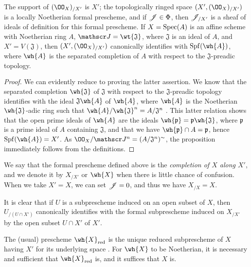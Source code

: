 \begin{prop}[10.8.5]
\label{1.10.8.5}
The support of $(\OO_X)_{/X'}$ is $X'$; the topologically ringed space $(X',(\OO_X)_{/X'})$ is a locally Noetherian formal prescheme, and if $\mathscr{J}\in\Phi$, then $\mathscr{J}_{/X'}$ is a sheaf of ideals of definition for this formal prescheme.
If $X=\operatorname{Spec}(A)$ is an affine scheme with Noetherian ring $A$, $\sh{J}=\wt{\mathfrak{J}}$, where $\mathfrak{J}$ is an ideal of $A$, and $X'=V(\mathfrak{J})$, then $(X',(\OO_X)_{/X'})$ canonically identifies with $\Spf(\wh{A})$, where $\wh{A}$ is the separated completion of $A$ with respect to the $\mathfrak{J}$-preadic topology.
\end{prop}

\begin{proof}
\label{proof-1.10.8.5}
We can evidently reduce to proving the latter assertion.
We know  that the separated completion $\wh{\mathfrak{J}}$ of $\mathfrak{J}$ with respect to the $\mathfrak{J}$-preadic topology identifies with the ideal $\mathfrak{J}\wh{A}$ of $\wh{A}$, where $\wh{A}$ is the Noetherian $\wh{\mathfrak{J}}$-adic ring such that $\wh{A}/\wh{\mathfrak{J}}^n=A/\mathfrak{J}^n$ .
This latter relation shows that the open prime ideals of $\wh{A}$ are the ideals $\wh{\mathfrak{p}}=\mathfrak{p}\wh{\mathfrak{J}}$, where $\mathfrak{p}$ is a prime ideal of $A$ containing $\mathfrak{J}$, and that we have $\wh{\mathfrak{p}}\cap A=\mathfrak{p}$, hence $\Spf(\wh{A})=X'$.
As $\OO_X/\sh{J}^n=(A/\mathfrak{J}^n)^\sim$, the proposition immediately follows from the definitions.
\end{proof}

We say that the formal prescheme defined above is the \emph{completion of $X$ along $X'$}, and we denote it by $X_{/X'}$ or $\wh{X}$ when there is little chance of confusion.
When we take $X'=X$, we can set $\mathscr{J}=0$, and thus we have $X_{/X}=X$.

It is clear that if $U$ is a subprescheme induced on an open subset of $X$, then $U_{/(U\cap X')}$ canonically identifies with the formal subprescheme induced on $X_{/X'}$ by the open subset $U\cap X'$ of $X'$.

\begin{cor}[10.8.6]
\label{1.10.8.6}
The (usual) prescheme $\wh{X}_\red$ is the unique reduced subprescheme of $X$ having $X'$ for its underlying space .
For $\wh{X}$ to be Noetherian, it is necessary and sufficient that $\wh{X}_\red$ is, and it suffices that $X$ is.
\end{cor}


